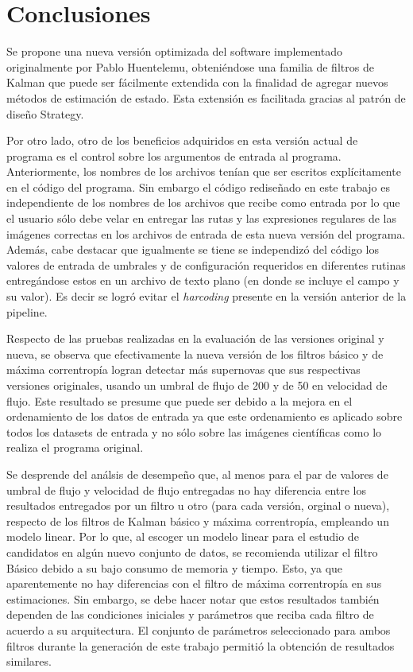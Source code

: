 \chapter{Conclusiones}
\label{ch:conclusion}

Se propone una nueva versi\'on optimizada del software implementado originalmente por Pablo Huentelemu, obteni\'endose una familia de filtros de Kalman que puede ser f\'acilmente extendida con la finalidad de agregar nuevos m\'etodos de estimaci\'on de estado. Esta extensi\'on es facilitada gracias al patr\'on de dise\~no Strategy.
\bigskip

Por otro lado, otro de los beneficios adquiridos en esta versi\'on actual de programa es el control sobre los argumentos de entrada al programa. Anteriormente, los nombres de los archivos ten\'ian que ser escritos expl\'icitamente en el c\'odigo del programa. Sin embargo el c\'odigo redise\~nado en este trabajo es independiente de los nombres de los archivos que recibe como entrada por lo que el usuario s\'olo debe velar en entregar las rutas y las expresiones regulares de las im\'agenes correctas en los archivos de entrada de esta nueva versi\'on del programa. Adem\'as, cabe destacar que igualmente se tiene se independiz\'o del c\'odigo los valores de entrada de umbrales y de configuraci\'on requeridos en diferentes rutinas entreg\'andose estos en un archivo de texto plano (en donde se incluye el campo y su valor). Es decir se logr\'o evitar el \textit{harcoding} presente en la versi\'on anterior de la pipeline.
\bigskip


Respecto de las pruebas realizadas en la evaluaci\'on de las versiones original y nueva, se observa que efectivamente la nueva versi\'on de los filtros b\'asico y de m\'axima correntrop\'ia logran detectar m\'as supernovas que sus respectivas versiones originales, usando un umbral de flujo de 200 y de 50 en velocidad de flujo. Este resultado se presume que puede ser debido a la mejora en el ordenamiento de los datos de entrada ya que este ordenamiento es aplicado sobre todos los datasets de entrada y no s\'olo sobre las im\'agenes cient\'ificas como lo realiza el programa original.
\bigskip

Se desprende del an\'alsis de desempe\~no que, al menos para el par de valores de umbral de flujo y velocidad de flujo entregadas no hay diferencia entre los resultados entregados por un filtro u otro (para cada versi\'on, orginal o nueva), respecto de los filtros de Kalman b\'asico y m\'axima correntrop\'ia, empleando un modelo linear. Por lo que, al escoger un modelo linear para el estudio de candidatos en alg\'un nuevo conjunto de datos, se recomienda utilizar el filtro B\'asico debido a su bajo consumo de memoria y tiempo. Esto, ya que aparentemente no hay diferencias con el filtro de m\'axima correntrop\'ia en sus estimaciones. Sin embargo, se debe hacer notar que estos resultados tambi\'en dependen de las condiciones iniciales y par\'ametros que reciba cada filtro de acuerdo a su arquitectura. El conjunto de par\'ametros seleccionado para ambos filtros durante la generaci\'on de este trabajo permiti\'o la obtenci\'on de resultados similares.
\bigskip


